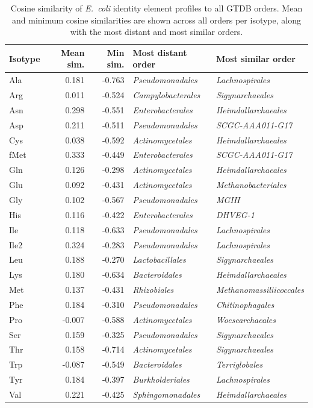 \begin{table}[!ht]
\centering
\small
\caption{Cosine similarity of \textit{E.~coli} identity element profiles to all GTDB orders. Mean and minimum cosine similarities are shown across all orders per isotype, along with the most distant and most similar orders.}
\label{tab:ecoli_all}
\begin{tabular}{lrrll}
\toprule
Isotype & Mean sim. & Min sim. & Most distant order & Most similar order \\
\midrule
  Ala & 0.181 & -0.763 & \textit{Pseudomonadales} & \textit{Lachnospirales} \\
  Arg & 0.011 & -0.524 & \textit{Campylobacterales} & \textit{Sigynarchaeales} \\
  Asn & 0.298 & -0.551 & \textit{Enterobacterales} & \textit{Heimdallarchaeales} \\
  Asp & 0.211 & -0.511 & \textit{Pseudomonadales} & \textit{SCGC-AAA011-G17} \\
  Cys & 0.038 & -0.592 & \textit{Actinomycetales} & \textit{Heimdallarchaeales} \\
  fMet & 0.333 & -0.449 & \textit{Enterobacterales} & \textit{SCGC-AAA011-G17} \\
  Gln & 0.126 & -0.298 & \textit{Actinomycetales} & \textit{Heimdallarchaeales} \\
  Glu & 0.092 & -0.431 & \textit{Actinomycetales} & \textit{Methanobacteriales} \\
  Gly & 0.102 & -0.567 & \textit{Pseudomonadales} & \textit{MGIII} \\
  His & 0.116 & -0.422 & \textit{Enterobacterales} & \textit{DHVEG-1} \\
  Ile & 0.118 & -0.633 & \textit{Pseudomonadales} & \textit{Lachnospirales} \\
  Ile2 & 0.324 & -0.283 & \textit{Pseudomonadales} & \textit{Lachnospirales} \\
  Leu & 0.188 & -0.270 & \textit{Lactobacillales} & \textit{Sigynarchaeales} \\
  Lys & 0.180 & -0.634 & \textit{Bacteroidales} & \textit{Heimdallarchaeales} \\
  Met & 0.137 & -0.431 & \textit{Rhizobiales} & \textit{Methanomassiliicoccales} \\
  Phe & 0.184 & -0.310 & \textit{Pseudomonadales} & \textit{Chitinophagales} \\
  Pro & -0.007 & -0.588 & \textit{Actinomycetales} & \textit{Woesearchaeales} \\
  Ser & 0.159 & -0.325 & \textit{Pseudomonadales} & \textit{Sigynarchaeales} \\
  Thr & 0.158 & -0.714 & \textit{Actinomycetales} & \textit{Sigynarchaeales} \\
  Trp & -0.087 & -0.549 & \textit{Bacteroidales} & \textit{Terriglobales} \\
  Tyr & 0.184 & -0.397 & \textit{Burkholderiales} & \textit{Lachnospirales} \\
  Val & 0.221 & -0.425 & \textit{Sphingomonadales} & \textit{Heimdallarchaeales} \\
\bottomrule
\end{tabular}
\end{table}

